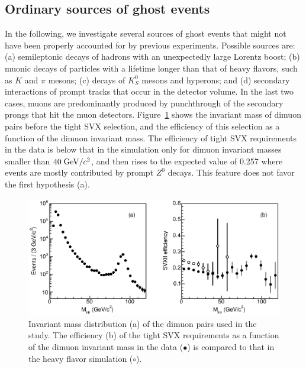 \documentclass[aps,prd,preprint,floatfix,nofootinbib,superscriptaddress,showpacs,amssymb]{revtex4}
\begin{document}
\subsection{Ordinary sources of ghost events}\label{sec:ss-origin}
 In the following, we investigate several sources of ghost
 events that might not have been properly accounted
 for by previous experiments. Possible sources are:
 (a) semileptonic decays of hadrons with an unexpectedly large Lorentz boost;
 (b) muonic decays of particles with a lifetime longer than that of heavy
 flavors, such as $K$ and $\pi$ mesons; (c) decays of  $K^0_S$ mesons and
 hyperons; and (d) secondary interactions of prompt tracks that occur in 
 the detector volume.
 In the last two cases, muons are predominantly produced by punchthrough
 of the secondary prongs that hit the muon detectors.
 Figure~\ref{fig:fig_2} shows the invariant mass of dimuon pairs before
 the tight SVX selection, and the efficiency of this selection as a
 function of the dimuon invariant mass. The efficiency of tight SVX
 requirements in the data is below that in the simulation
 only for dimuon invariant masses smaller than $40\; {\rm GeV/}c^2$, and then
 rises to the expected value of 0.257 where events are mostly contributed
 by prompt $Z^0$ decays. This feature does not favor the first hypothesis (a).
 \begin{figure}
 \begin{center}
 \vspace{-0.3in}
 \leavevmode
 \includegraphics*[width=\textwidth]{fa0_2.eps}
 \caption[]{Invariant mass distribution (a) of the dimuon pairs used in the
            study. The efficiency (b) of the tight SVX requirements as a 
            function of the dimuon invariant mass in the data ($\bullet$)
            is compared to that in the heavy flavor simulation ($\circ$).}
 \label{fig:fig_2}
 \end{center}
 \end{figure}
\end{document}
